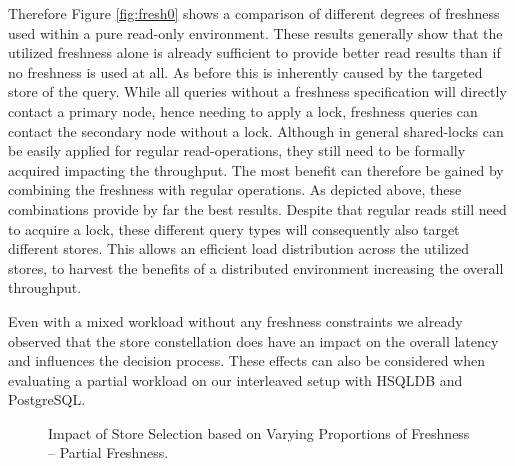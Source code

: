 Therefore Figure \ref{fig:fresh0} shows a comparison of different degrees of freshness used within a pure read-only environment.
These results generally show that the utilized freshness alone is already sufficient to provide better read results than if no freshness is used at all.
As before this is inherently caused by the targeted store of the query. While all queries without a freshness specification will directly contact a primary node,
hence needing to apply a lock, freshness queries can contact the secondary node without a lock. Although in general shared-locks can be easily applied for regular read-operations, they still need to be formally acquired impacting
the throughput. The most benefit can therefore be gained by combining the freshness with regular operations. As depicted above, these combinations provide by far 
the best results. Despite that regular reads still need to acquire a lock, these different query types will consequently also target different stores. 
This allows an efficient load distribution across the utilized stores, to harvest the benefits of a distributed environment increasing the overall throughput.




Even with a mixed workload without any freshness constraints we already observed that the store constellation does have an impact on the overall latency 
and influences the decision process. 
These effects can also be considered when evaluating a partial workload on our interleaved setup with HSQLDB and PostgreSQL.


\begin{figure}[t] 
    \centering 
    \caption{Impact of Store Selection based on Varying Proportions of Freshness -- Partial Freshness.}
    \label{fig:mixed}
\end{figure}

